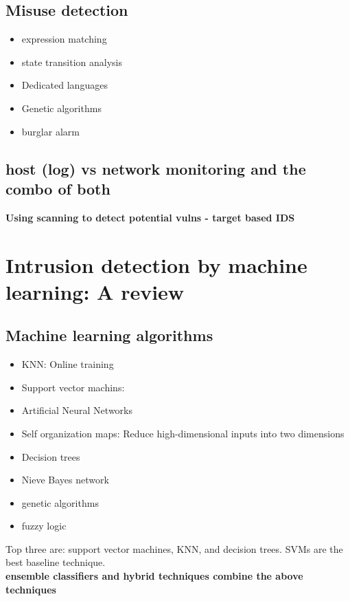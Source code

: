 \documentclass{article}
\begin{document}
\subsection*{Misuse detection}
\begin{itemize}
    \item expression matching
    \item state transition analysis
    \item Dedicated languages
    \item Genetic algorithms
    \item burglar alarm 
\end{itemize}

\subsection*{host (log) vs network monitoring and the combo of both}

\textbf{Using scanning to detect potential vulns - target based IDS}



\section*{Intrusion detection by machine learning: A review}
\cite{tsai09}
\subsection*{Machine learning algorithms}
\begin{itemize}
    \item KNN: Online training
    \item Support vector machins:  
    \item Artificial Neural Networks
    \item Self organization maps: Reduce high-dimensional inputs into two dimensions
    \item Decision trees
    \item Nieve Bayes network
    \item genetic algorithms
    \item fuzzy logic
\end{itemize}
Top three are: support vector machines, KNN, and decision trees. SVMs are the best baseline technique.\\

\textbf{ensemble classifiers and hybrid techniques combine the above techniques}\\
\end{document}
